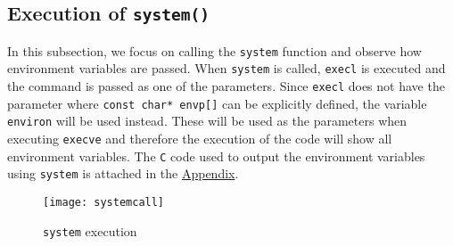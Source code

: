 \documentclass[a4paper,12pt]{article}
\begin{document}
\subsection{Execution of \texttt{system()}}
In this subsection, we focus on calling the \texttt{system} function and observe how environment variables are passed. When \texttt{system} is called, \texttt{execl} is executed and the command is passed as one of the parameters. Since \texttt{execl} does not have the parameter where \texttt{const char* envp[]} can be explicitly defined, the variable \texttt{environ} will be used instead. These will be used as the parameters when executing \texttt{execve} and therefore the execution of the code will show all environment variables. The \texttt{C} code used to output the environment variables using \texttt{system} is attached in the \hyperref[Appsec:3.4]{Appendix}.
\begin{figure}[H]
	\centering
	\texttt{[image: systemcall]}
	\caption{\texttt{system} execution}
	\label{fig:systemcall}
\end{figure}
\end{document}
